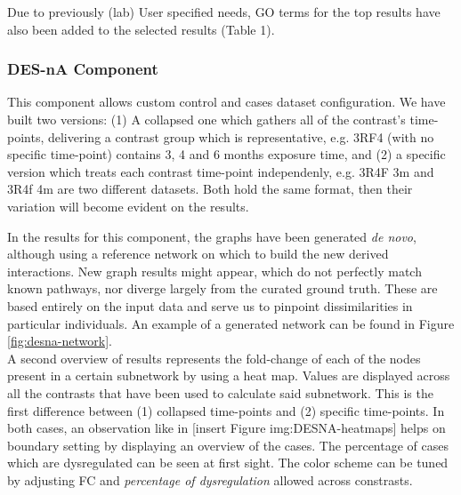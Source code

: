 Due to previously (lab) User specified needs, GO terms for the top results have also been added to the selected results (Table 1).

\subsubsection{DES-nA Component}
This component allows custom control and cases dataset configuration. We have built two versions: (1) A collapsed one which gathers all of the contrast's time-points, delivering a contrast group which is representative, e.g. 3RF4 (with no specific time-point) contains 3, 4 and 6 months exposure time, and (2) a specific version which treats each contrast time-point independenly, e.g. 3R4F 3m and 3R4f 4m are two different datasets. Both hold the same format, then their variation will become evident on the results.

In the results for this component, the graphs have been generated \textit{de novo}, although using a reference network on which to build the new derived interactions. New graph results might appear, which do not perfectly match known pathways, nor diverge largely from the curated ground truth. These are based entirely on the input data and serve us to pinpoint dissimilarities in particular individuals. An example of a generated network can be found in Figure \ref{fig:desna-network}.
\\

A second overview of results represents the fold-change of each of the nodes present in a certain subnetwork by using a heat map. Values are displayed across all the contrasts that have been used to calculate said subnetwork. This is the first difference between (1) collapsed time-points and (2) specific time-points. In both cases, an observation like in [insert Figure img:DESNA-heatmaps] helps on boundary setting by displaying an overview of the cases. The percentage of cases which are dysregulated can be seen at first sight. The color scheme can be tuned by adjusting FC and \textit{percentage of dysregulation} allowed across constrasts.
\\

